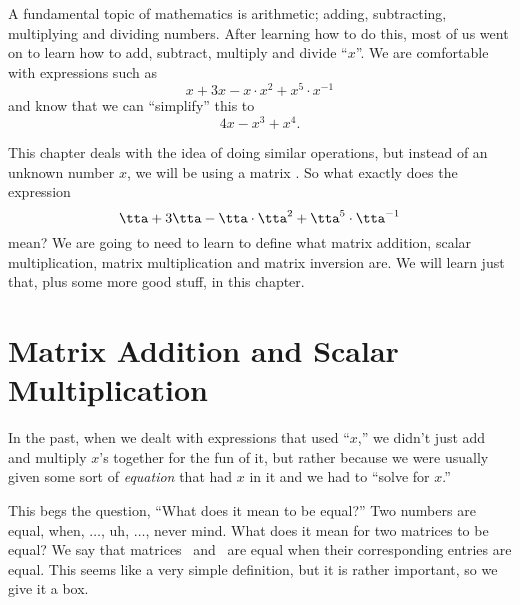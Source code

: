 A fundamental topic of mathematics is arithmetic; adding, subtracting, multiplying and dividing numbers. After learning how to do this, most of us went on to learn how to add, subtract, multiply and divide ``$x$''. We are comfortable with expressions such as 
\[
x+3x-x\cdot x^2+x^5\cdot x^{-1}
\]
and know that we can ``simplify'' this to 
\[
4x-x^3+x^4.
\]

This chapter deals with the idea of doing similar operations, but instead of an unknown number $x$, we will be using a matrix \tta. So what exactly does the expression 
\[
\tta+3\tta-\tta\cdot \tta^2+\tta^5\cdot \tta^{-1}
\]
mean? We are going to need to learn to define what matrix addition, scalar multiplication, matrix multiplication and matrix inversion are. We will learn just that, plus some more good stuff, in this chapter.

\section{Matrix Addition and Scalar Multiplication}\label{sec:matrix_arithmetic_1}


In the past, when we dealt with expressions that used ``$x$,'' we didn't just add and multiply $x$'s together for the fun of it, %
but rather because we were usually given some sort of \textit{equation} that had $x$ in it and we had to ``solve for $x$.''

This begs the question, ``What does it mean to be equal?'' Two numbers are equal, when, $\ldots$, uh, $\ldots$, never mind. What does it mean for two matrices to be equal? We say that matrices \tta\ and \ttb\ are equal when their corresponding entries are equal. This seems like a very simple definition, but it is rather important, so we give it a box.

\smallskip


